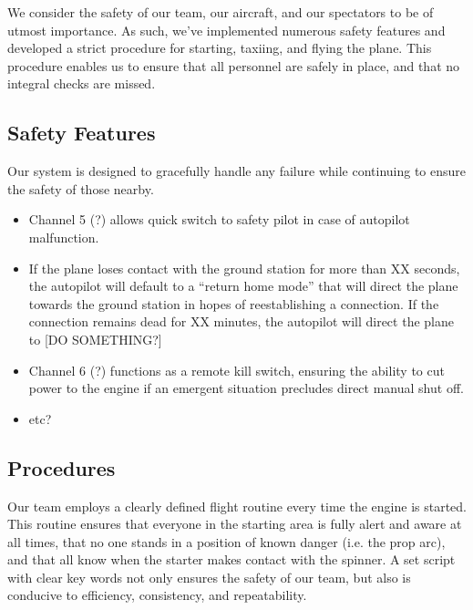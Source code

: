 \documentclass[10pt]{report}
\begin{document}
We consider the safety of our team, our aircraft, and our spectators to be of utmost importance.  As such, we've implemented numerous safety features and developed a strict procedure for starting, taxiing, and flying the plane.  This procedure enables us to ensure that all personnel are safely in place, and that no integral checks are missed.

\subsection{Safety Features}
Our system is designed to gracefully handle any failure while continuing to ensure the safety of those nearby. 
\begin{itemize}
	\setlength{\itemsep}{0cm}
	\setlength{\parskip}{0cm}
	\item Channel 5 (?) allows quick switch to safety pilot in case of autopilot malfunction.
	\item If the plane loses contact with the ground station for more than XX seconds, the autopilot will default to a ``return home mode'' that will direct the plane towards the ground station in hopes of reestablishing a connection.  If the connection remains dead for XX minutes, the autopilot will direct the plane to [DO SOMETHING?]
	\item Channel 6 (?) functions as a remote kill switch, ensuring the ability to cut power to the engine if an emergent situation precludes direct manual shut off.
	\item etc?
\end{itemize}

\subsection{Procedures}
Our team employs a clearly defined flight routine every time the engine is started.  This routine ensures that everyone in the starting area is fully alert and aware at all times, that no one stands in a position of known danger (i.e. the prop arc), and that all know when the starter makes contact with the spinner.  A set script with clear key words not only ensures the safety of our team, but also is conducive to efficiency, consistency, and repeatability.

\newpage
\appendix
\renewcommand\thesection{Appendix \Alph{section}}
\end{document}
